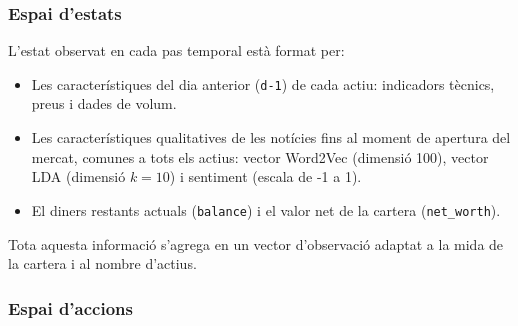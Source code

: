 \documentclass[12pt,a4paper,twoside]{book}
\begin{document}
\subsubsection{Espai d'estats}

L'estat observat en cada pas temporal està format per:
\begin{itemize}
    \item Les característiques del dia anterior (\texttt{d-1}) de cada actiu: indicadors tècnics, preus i dades de volum.
    \item Les característiques qualitatives de les notícies fins al moment de apertura del mercat, comunes a tots els actius: vector Word2Vec (dimensió 100), vector LDA (dimensió $k=10$) i sentiment (escala de -1 a 1).
    \item El diners restants actuals (\texttt{balance}) i el valor net de la cartera (\texttt{net\_worth}).
\end{itemize}

Tota aquesta informació s'agrega en un vector d'observació adaptat a la mida de la cartera i al nombre d'actius.

\subsubsection{Espai d'accions}
\end{document}

